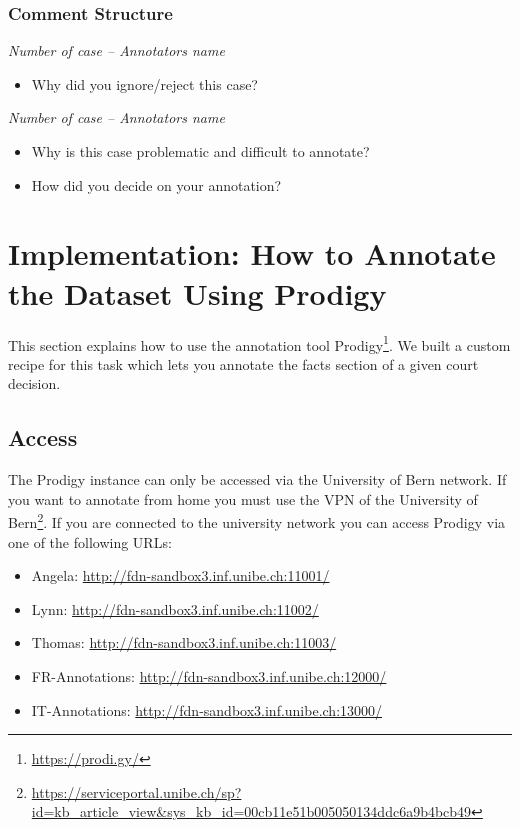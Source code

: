 \documentclass{article}
\begin{document}
\subsubsection{Comment Structure}
\begin{mdframed}[frametitle={Comment for rejecting and ignoring case}]
\emph{Number of case – Annotators name}

\begin{itemize}
	\item Why did you ignore/reject this case?
\end{itemize}	
\end{mdframed}

\begin{mdframed}[frametitle={Comment for generally problematic case}]
\emph{Number of case – Annotators name}

\begin{itemize}
	\item Why is this case problematic and difficult to annotate?

\item How did you decide on your annotation?
\end{itemize}
\end{mdframed}

\section{Implementation: How to Annotate the Dataset Using Prodigy}
This section explains how to use the annotation tool Prodigy\footnote{\href{https://prodi.gy/}{https://prodi.gy/}}. We built a custom recipe for this task which lets you annotate the facts section of a given court decision.

\subsection{Access}
The Prodigy instance can only be accessed via the University of Bern network. If you want to annotate from home you must use the VPN of the University of Bern\footnote{\href{https://serviceportal.unibe.ch/sp?id=kb_article_view&sys_kb_id=00cb11e51b005050134ddc6a9b4bcb49}{https://serviceportal.unibe.ch/sp?id=kb_article_view&sys_kb_id=00cb11e51b005050134ddc6a9b4bcb49}}.
If you are connected to the university network you can access Prodigy via one of the following URLs:
\begin{itemize}
	\item Angela: \href{http://fdn-sandbox3.inf.unibe.ch:11001/}{http://fdn-sandbox3.inf.unibe.ch:11001/}
    \item Lynn: \href{http://fdn-sandbox3.inf.unibe.ch:11002/}{http://fdn-sandbox3.inf.unibe.ch:11002/}
    \item Thomas: \href{http://fdn-sandbox3.inf.unibe.ch:11003/}{http://fdn-sandbox3.inf.unibe.ch:11003/}
    \item FR-Annotations: \href{http://fdn-sandbox3.inf.unibe.ch:12000/}{http://fdn-sandbox3.inf.unibe.ch:12000/}
    \item IT-Annotations: \href{http://fdn-sandbox3.inf.unibe.ch:13000/}{http://fdn-sandbox3.inf.unibe.ch:13000/}
\end{itemize}
\end{document}
